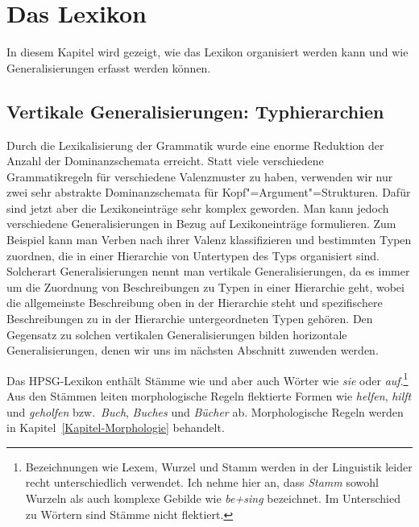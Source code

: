

\chapter{Das Lexikon}
\label{Kapitel-Lexikon}

In diesem Kapitel wird gezeigt, wie das Lexikon organisiert werden kann
und wie Generalisierungen erfasst werden können.


\section{Vertikale Generalisierungen: Typhierarchien}
\label{Abschnitt-Typhierarchien}

Durch die Lexikalisierung der Grammatik wurde eine enorme Reduktion der Anzahl der Dominanzschemata
erreicht. Statt viele verschiedene Grammatikregeln für verschiedene Valenzmuster zu haben, verwenden
wir nur zwei sehr abstrakte Dominanzschemata für Kopf"=Argument"=Strukturen. Dafür sind jetzt aber
die Lexikoneinträge sehr komplex geworden. Man kann jedoch verschiedene Generalisierungen in Bezug auf
Lexikoneinträge formulieren. Zum Beispiel kann man Verben nach ihrer Valenz klassifizieren
und bestimmten Typen zuordnen, die in einer Hierarchie von Untertypen des Typs 
organisiert sind. Solcherart Generalisierungen nennt man vertikale Generalisierungen, da
es immer um die Zuordnung von Beschreibungen zu Typen in einer Hierarchie geht, wobei die
allgemeinste Beschreibung oben in der Hierarchie steht und spezifischere Beschreibungen
zu in der Hierarchie untergeordneten Typen gehören. Den Gegensatz zu solchen vertikalen
Generalisierungen bilden horizontale Generalisierungen, denen wir uns im nächsten Abschnitt zuwenden werden.

Das HPSG-Lexikon enthält Stämme wie \zb {} und  aber auch Wörter wie \emph{sie}
oder \emph{auf}.\footnote{
  Bezeichnungen wie Lexem, Wurzel und Stamm 
  werden in der Linguistik leider recht unterschiedlich verwendet. 
  Ich nehme hier an, dass \emph{Stamm} sowohl Wurzeln als auch komplexe Gebilde wie
  \emph{be+sing} bezeichnet. Im Unterschied zu Wörtern sind Stämme nicht flektiert.%
} Aus den Stämmen leiten morphologische Regeln flektierte Formen wie \emph{helfen},
\emph{hilft} und \emph{geholfen} bzw.\ \emph{Buch}, \emph{Buches} und \emph{Bücher}
ab. Morphologische Regeln werden in Kapitel~\ref{Kapitel-Morphologie} behandelt.

